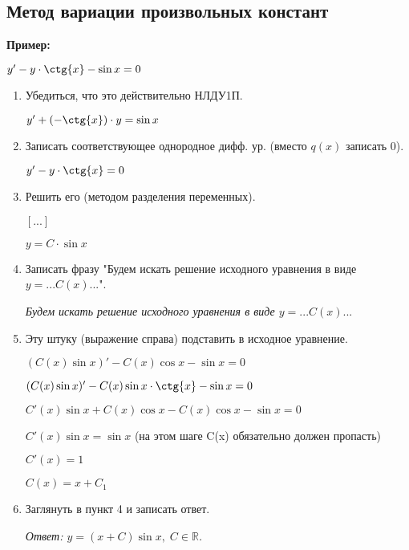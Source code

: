 \documentclass[10pt, a4paper]{article}
\begin{document}
\subsection{Метод вариации произвольных констант}
\textbf{Пример:}
\par $y' - y \cdot \ctg{x} - \sin{x} = 0$
\begin{enumerate}
    \item Убедиться, что это действительно НЛДУ1П.
        \par $y' + (-\ctg{x}) \cdot y = \sin{x}$
    \item Записать соответствующее однородное дифф. ур. (вместо $q(x)$ записать $0$).
        \par $y' - y \cdot \ctg{x} = 0$
    \item Решить его (методом разделения переменных).
        \par $[...]$
        \par $y = C \cdot \sin{x}$
    \item Записать фразу "Будем искать решение исходного уравнения в виде $y = ...C(x)...$".
        \par\textit{Будем искать решение исходного уравнения в виде $y = ...C(x)...$}
    \item Эту штуку (выражение справа) подставить в исходное уравнение.
        \par $(C(x)\sin{x})' - C(x)\cos{x} - \sin{x} = 0$
        \par $(C(x)\sin{x})' - C(x)\sin{x} \cdot \ctg{x} - \sin{x} = 0$
        \par $C'(x)\sin{x} + C(x)\cos{x} - C(x)\cos{x} - \sin{x} = 0$
        \par $C'(x)\sin{x} = \sin{x}$ (на этом шаге C(x) обязательно должен пропасть)
        \par $C'(x) = 1$
        \par $C(x) = x + C_{1}$
    \item Заглянуть в пункт 4 и записать ответ.
        \par\textit{Ответ: $y = (x + C)\sin{x}, \; C \in \mathbb{R}$.}
\end{enumerate}
\end{document}
